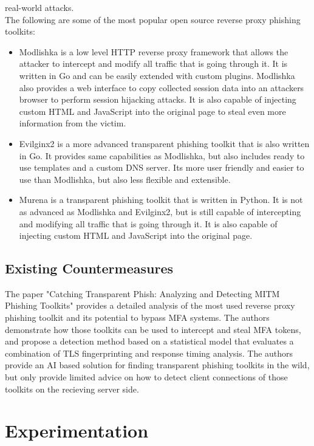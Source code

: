 \documentclass[12pt]{report}
\begin{document}
real-world attacks. \\ The following are some of the most popular open source reverse proxy phishing toolkits:
\begin{itemize}
  \item Modlishka \cite{modlishka} is a low level HTTP reverse proxy framework that allows the attacker to intercept and modify
    all traffic that is going through it. It is written in Go and can be easily extended with custom plugins. Modlishka also provides
    a web interface to copy collected session data into an attackers browser to perform session hijacking attacks.
    It is also capable of injecting custom HTML and JavaScript into the original page to steal even more information from the victim.

  \item Evilginx2 \cite{evilginx2} is a more advanced transparent phishing toolkit that is also written in Go. It provides same
    capabilities as Modlishka, but also includes ready to use templates and a custom DNS server. Its more user friendly and easier to use
    than Modlishka, but also less flexible and extensible.

  \item Murena \cite{murena} is a transparent phishing toolkit that is written in Python. It is not as advanced as Modlishka and Evilginx2,
    but is still capable of intercepting and modifying all traffic that is going through it. It is also capable of injecting custom HTML and
    JavaScript into the original page.
\end{itemize}


\section{Existing Countermeasures}
The paper "Catching Transparent Phish: Analyzing and Detecting MITM Phishing Toolkits" \cite{kondracki2021catching} provides a detailed
analysis of the most used reverse proxy phishing toolkit and its potential to
bypass MFA systems. The authors demonstrate how those toolkits can be used to intercept
and steal MFA tokens, and propose a detection method based on a statistical
model that evaluates a combination of TLS fingerprinting and response timing
analysis. The authors provide an AI based solution for finding transparent phishing
toolkits in the wild, but only provide limited advice on how to detect client
connections of those toolkits on the recieving server side.

\newpage
\chapter{Experimentation}
\end{document}
